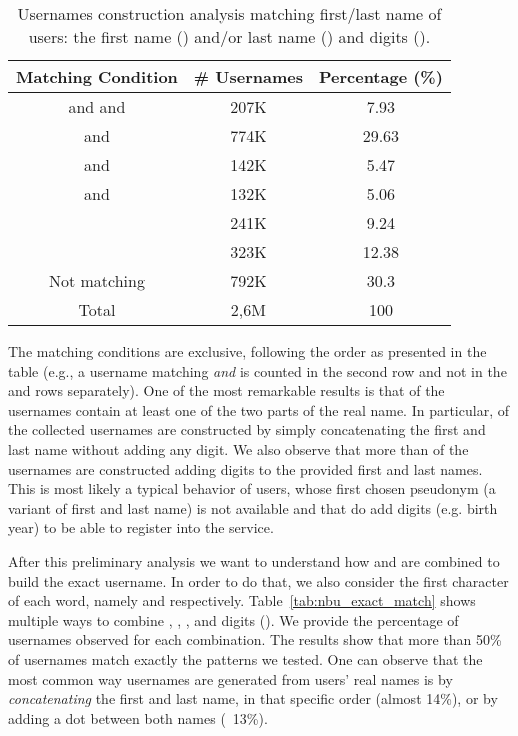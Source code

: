 \documentclass[letterpaper]{sig-alternate}
\begin{document}
\begin{table} [ht!]
  \centering
      \scriptsize
      \begin{tabular}{|c|c|c|}
        \hline
        Matching Condition & \# Usernames & Percentage (\%) \\
        \hline
        \hline
          and  and  &  207K  & 7.93 \\
        \hline
          and  &  774K &  29.63 \\
        \hline
          and  & 142K  & 5.47\\
        \hline
          and  & 132K &  5.06\\
        \hline
          &  241K &  9.24\\
        \hline
          &  323K &  12.38\\
        \hline
         Not matching & 792K &  30.3\\
        \hline 
        \hline
         Total & 2,6M & 100\\
        \hline
      \end{tabular}
  \caption{Usernames construction analysis matching first/last name of users: the first name () and/or last name () and digits ().}
 \label{tab:nbu_partial_match}
\end{table}

The matching conditions are exclusive, following the order as presented in the
table (e.g., a username matching  \emph{and}  is counted in the
second row and not in the  and  rows separately). One of the most
remarkable results is that  of the usernames contain at least one of the
two parts of the real name. In particular,  of the collected usernames are
constructed by simply concatenating the first and last name without adding any
digit. We also observe that more than  of the usernames are constructed
adding digits to the provided first and last names. This is most likely a
typical behavior of users, whose first chosen pseudonym (a variant of first
and last name) is not available and  that do add digits (e.g. birth year) to
be able to register into the service.





After this preliminary analysis we want to understand how  and  are
combined to build the exact username. In order to do that, we also consider the
first character of each word, namely  and  respectively.
Table~\ref{tab:nbu_exact_match} shows multiple ways to combine , ,
,  and digits ().  We provide the percentage of usernames observed
for each combination. The results show that more than 50\% of usernames match
exactly the patterns we tested.  One can observe that the most common way
usernames are generated from users' real names is by \textit{concatenating}
the first and last name, in that specific order (almost 14\%), or by adding
a dot between both names (~13\%).
\end{document}
